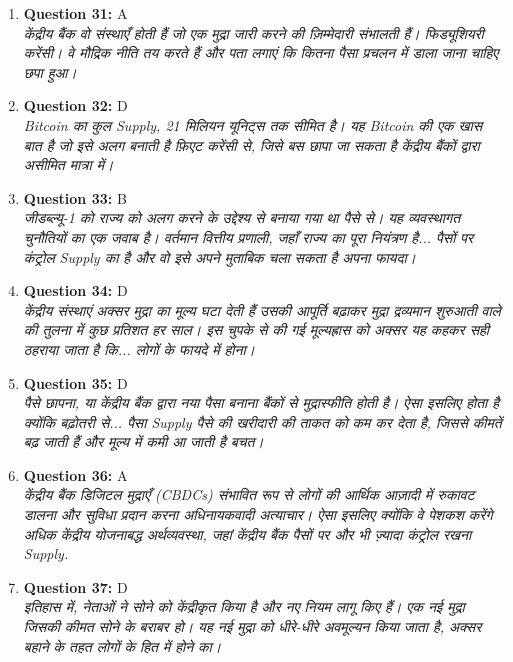 \documentclass[12pt,a4paper]{article}
\begin{document}
\begin{enumerate}
\item \textbf{Question 31:} A
\\ \textit{केंद्रीय बैंक वो संस्थाएँ होती हैं जो एक मुद्रा जारी करने की ज़िम्मेदारी संभालती हैं। फिड्यूशियरी करेंसी। वे मौद्रिक नीति तय करते हैं और पता लगाएं कि कितना पैसा प्रचलन में डाला जाना चाहिए छपा हुआ।}

\item \textbf{Question 32:} D
\\ \textit{Bitcoin का कुल Supply, 21 मिलियन यूनिट्स तक सीमित है। यह Bitcoin की एक खास बात है जो इसे अलग बनाती है फ़िएट करेंसी से, जिसे बस छापा जा सकता है केंद्रीय बैंकों द्वारा असीमित मात्रा में।}

\item \textbf{Question 33:} B
\\ \textit{जीडब्ल्यू-1 को राज्य को अलग करने के उद्देश्य से बनाया गया था पैसे से। यह व्यवस्थागत चुनौतियों का एक जवाब है। वर्तमान वित्तीय प्रणाली, जहाँ राज्य का पूरा नियंत्रण है... पैसों पर कंट्रोल Supply का है और वो इसे अपने मुताबिक चला सकता है अपना फायदा।}

\item \textbf{Question 34:} D
\\ \textit{केंद्रीय संस्थाएं अक्सर मुद्रा का मूल्य घटा देती हैं उसकी आपूर्ति बढ़ाकर मुद्रा द्रव्यमान शुरुआती वाले की तुलना में कुछ प्रतिशत हर साल। इस चुपके से की गई मूल्यह्रास को अक्सर यह कहकर सही ठहराया जाता है कि... लोगों के फायदे में होना।}

\item \textbf{Question 35:} D
\\ \textit{पैसे छापना, या केंद्रीय बैंक द्वारा नया पैसा बनाना बैंकों से मुद्रास्फीति होती है। ऐसा इसलिए होता है क्योंकि बढ़ोतरी से... पैसा Supply पैसे की खरीदारी की ताकत को कम कर देता है, जिससे कीमतें बढ़ जाती हैं और मूल्य में कमी आ जाती है बचत।}

\item \textbf{Question 36:} A
\\ \textit{केंद्रीय बैंक डिजिटल मुद्राएँ (CBDCs) संभावित रूप से लोगों की आर्थिक आज़ादी में रुकावट डालना और सुविधा प्रदान करना अधिनायकवादी अत्याचार। ऐसा इसलिए क्योंकि वे पेशकश करेंगे अधिक केंद्रीय योजनाबद्ध अर्थव्यवस्था, जहां केंद्रीय बैंक पैसों पर और भी ज़्यादा कंट्रोल रखना Supply.}

\item \textbf{Question 37:} D
\\ \textit{इतिहास में, नेताओं ने सोने को केंद्रीकृत किया है और नए नियम लागू किए हैं। एक नई मुद्रा जिसकी कीमत सोने के बराबर हो। यह नई मुद्रा को धीरे-धीरे अवमूल्यन किया जाता है, अक्सर बहाने के तहत लोगों के हित में होने का।}


\end{enumerate}
\end{document}
